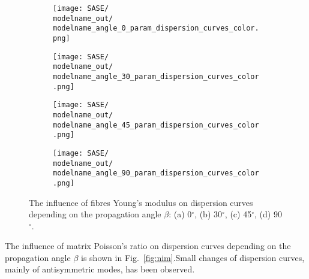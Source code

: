 \documentclass[preprint,12pt]{elsarticle}
\begin{document}
\begin{figure} [h!]
	\centering
	\newcommand{\modelname}{SASE5}
	\begin{subfigure}[b]{0.49\textwidth}
		\centering
		\texttt{[image: SASE/\\modelname\_out/\\modelname\_angle\_0\_param\_dispersion\_curves\_color.png]}
		\caption{}
		\label{fig:ef0}
	\end{subfigure}
	\hfill
	\begin{subfigure}[b]{0.49\textwidth}
		\centering
		\texttt{[image: SASE/\\modelname\_out/\\modelname\_angle\_30\_param\_dispersion\_curves\_color.png]}
		\caption{}
		\label{fig:ef30}
	\end{subfigure}
	\begin{subfigure}[b]{0.49\textwidth}
		\centering
		\texttt{[image: SASE/\\modelname\_out/\\modelname\_angle\_45\_param\_dispersion\_curves\_color.png]}
		\caption{}
		\label{fig:ef45}
	\end{subfigure}
	\hfill
	\begin{subfigure}[b]{0.49\textwidth}
		\centering
		\texttt{[image: SASE/\\modelname\_out/\\modelname\_angle\_90\_param\_dispersion\_curves\_color.png]}
		\caption{}
		\label{fig:ef90}
	\end{subfigure}
	\caption{The influence of fibres Young's modulus on dispersion curves depending on the propagation angle $\beta$: (a) 0$^{\circ}$, (b) 30$^{\circ}$, (c) 45$^{\circ}$, (d) 90$^{\circ}$.} 
	\label{fig:ef}
\end{figure}
\clearpage

The influence of matrix Poisson's ratio on dispersion curves depending on the propagation angle $\beta$ is shown in Fig.~\ref{fig:nim}.Small changes of dispersion curves, mainly of antisymmetric modes, has been observed.
\end{document}
